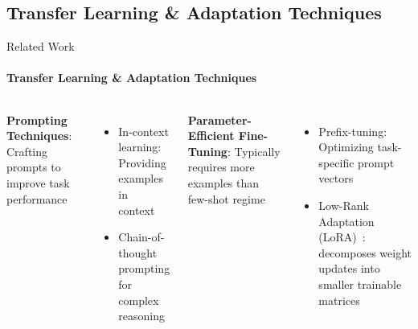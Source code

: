 \documentclass[aspectratio=169]{beamer}
\begin{document}
\subsection{Transfer Learning \& Adaptation Techniques}
\begin{frame}{Related Work}
\framesubtitle{Transfer Learning \& Adaptation Techniques}
  \begin{columns}[T]
      \textbf{Prompting Techniques}: Crafting prompts to improve task performance~
      \begin{itemize}
        \item In-context learning: Providing examples in context~
        \item Chain-of-thought prompting for complex reasoning~
      \end{itemize}
      \vspace{0.5em}
      \textbf{Parameter-Efficient Fine-Tuning}: Typically requires more examples than few-shot regime
      \begin{itemize}
        \item Prefix-tuning: Optimizing task-specific prompt vectors~
        \item Low-Rank Adaptation (LoRA)~: decomposes weight updates into smaller trainable matrices
      \end{itemize}
  \end{columns}
\end{frame}
\end{document}
